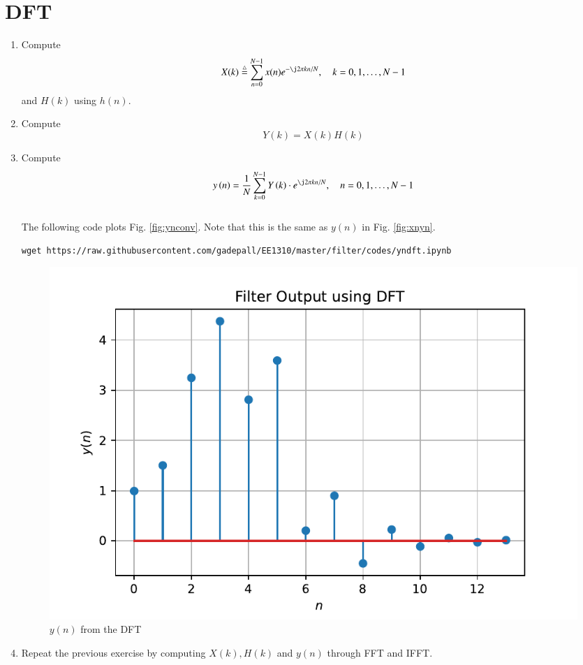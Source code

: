 \documentclass[journal,12pt,twocolumn]{IEEEtran}
\renewcommand\thesection{\arabic{section}}
\begin{document}
\section{DFT}
\begin{enumerate}[label=\thesection.\arabic*]
\item
Compute
\begin{equation}
X(k) \define \sum _{n=0}^{N-1}x(n) e^{-\j2\pi kn/N}, \quad k = 0,1,\dots, N-1
\end{equation}
and $H(k)$ using $h(n)$.
\item Compute 
\begin{equation}
Y(k) = X(k)H(k)
\end{equation}
\item Compute
\begin{equation}
 y\brak{n}={\frac {1}{N}}\sum _{k=0}^{N-1}Y\brak{k}\cdot e^{\j 2\pi kn/N},\quad n = 0,1,\dots, N-1
\end{equation}
\\
\solution The following code plots Fig. \ref{fig:ynconv}. Note that this is the same as 
$y(n)$ in  Fig. 
\ref{fig:xnyn}. 
%
\begin{lstlisting}
wget https://raw.githubusercontent.com/gadepall/EE1310/master/filter/codes/yndft.ipynb
\end{lstlisting}
\begin{figure}[!ht]
\centering
\includegraphics[width=\columnwidth]{./figs/yndft}
\caption{$y(n)$ from the DFT}
\label{fig:yndft}
\end{figure}
\item Repeat the previous exercise by computing $X(k), H(k)$ and $y(n)$ through FFT and 
IFFT.
\end{enumerate}
%
\end{document}
